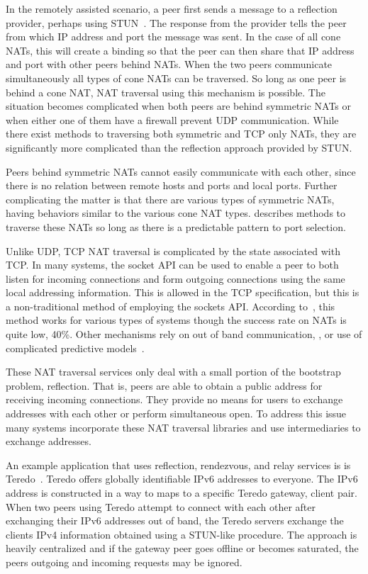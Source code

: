 \documentclass[conference]{IEEEtran}
\begin{document}
In the remotely assisted scenario, a peer first sends a message to a reflection
provider, perhaps using STUN~\cite{stun_rfc}.  The response from the provider
tells the peer from which IP address and port the message was sent.  In the
case of all cone NATs, this will create a binding so that the peer can then
share that IP address and port with other peers behind NATs.  When the two
peers communicate simultaneously all types of cone NATs can be traversed.  So
long as one peer is behind a cone NAT, NAT traversal using this mechanism is
possible.  The situation becomes complicated when both peers are behind
symmetric NATs or when either one of them have a firewall prevent UDP
communication.  While there exist methods to traversing both symmetric and TCP
only NATs, they are significantly more complicated than the reflection approach
provided by STUN.

Peers behind symmetric NATs cannot easily communicate with each other, since
there is no relation between remote hosts and ports and local ports.  Further
complicating the matter is that there are various types of symmetric NATs,
having behaviors similar to the various cone NAT types.  \cite{ice} describes
methods to traverse these NATs so long as there is a predictable pattern to
port selection.  

Unlike UDP, TCP NAT traversal is complicated by the state associated with TCP.
In many systems, the socket API can be used to enable a peer to both listen for
incoming connections and form outgoing connections using the same local
addressing information.  This is allowed in the TCP specification, but this is
a non-traditional method of employing the sockets API.  According
to~\cite{ice-tcp}, this method works for various types of systems though the
success rate on NATs is quite low, 40\%.  Other mechanisms rely on out of band
communication, \cite{pvc}, or use of complicated predictive
models~\cite{tcp-hole-punching}.

These NAT traversal services only deal with a small portion of the bootstrap
problem, reflection.  That is, peers are able to obtain a public address for
receiving incoming connections.  They provide no means for users to exchange
addresses with each other or perform simultaneous open.  To address this issue
many systems incorporate these NAT traversal libraries and use intermediaries
to exchange addresses.

An example application that uses reflection, rendezvous, and relay services is
is Teredo~\cite{teredo}.  Teredo offers globally identifiable IPv6 addresses to
everyone.  The IPv6 address is constructed in a way to maps to a specific
Teredo gateway, client pair.  When two peers using Teredo attempt to connect
with each other after exchanging their IPv6 addresses out of band, the Teredo
servers exchange the clients IPv4 information obtained using a STUN-like
procedure.  The approach is heavily centralized and if the gateway peer goes
offline or becomes saturated, the peers outgoing and incoming requests may be
ignored.  
\end{document}
